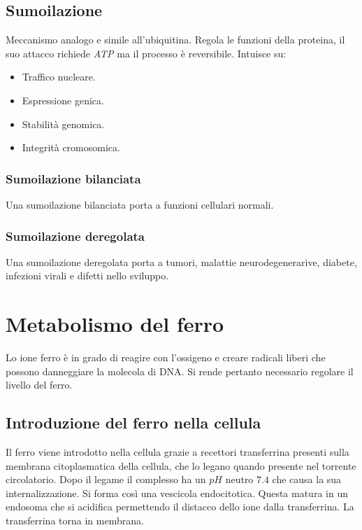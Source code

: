 	\subsection{Sumoilazione}
	Meccanismo analogo e simile all'ubiquitina. 
	Regola le funzioni della proteina, il suo attacco richiede \emph{ATP} ma il processo \`e reversibile.
	Intuisce su:
	\begin{multicols}{2}
		\begin{itemize}
			\item Traffico nucleare.
			\item Espressione genica.
			\item Stabilit\`a genomica.
			\item Integrit\`a cromosomica.
		\end{itemize}
	\end{multicols}

		\subsubsection{Sumoilazione bilanciata}
		Una sumoilazione bilanciata porta a funzioni cellulari normali.

		\subsubsection{Sumoilazione deregolata}
		Una sumoilazione deregolata porta a tumori, malattie neurodegenerarive, diabete, infezioni virali e difetti nello sviluppo.
\section{Metabolismo del ferro}
Lo ione ferro \`e in grado di reagire con l'ossigeno e creare radicali liberi che possono danneggiare la molecola di DNA.
Si rende pertanto necessario regolare il livello del ferro.

	\subsection{Introduzione del ferro nella cellula}
	Il ferro viene introdotto nella cellula grazie a recettori transferrina presenti sulla membrana citoplasmatica della cellula, che lo legano quando presente nel torrente circolatorio.
	Dopo il legame il complesso ha un $pH$ neutro $7.4
$ che causa la sua internalizzazione.
	Si forma cos\`i una vescicola endocitotica.
	Questa matura in un endosoma che si acidifica permettendo il distacco dello ione dalla transferrina.
	La transferrina torna in membrana.

